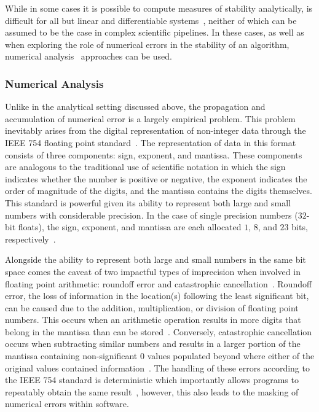 While in some cases it is possible to compute measures of stability analytically, is difficult for all but linear and
differentiable systems~\cite{kiusalaas2013numerical}, neither of which can be assumed to be the case in complex
scientific pipelines. In these cases, as well as when exploring the role of numerical errors in the stability of an
algorithm, numerical analysis~\cite{hildebrand1987introduction} approaches can be used.

\subsubsection{Numerical Analysis}
Unlike in the analytical setting discussed above, the propagation and accumulation of numerical error is a largely
empirical problem. This problem inevitably arises from the digital representation of non-integer data through the
IEEE 754 floating point standard~\cite{ieee754}. The representation of data in this format consists of three
components: sign, exponent, and mantissa. These components are analogous to the traditional use of scientific notation
in which the sign indicates whether the number is positive or negative, the exponent indicates the order of magnitude
of the digits, and the mantissa contains the digits themselves. This standard is powerful given its ability to
represent both large and small numbers with considerable precision. In the case of single precision numbers ($32$-bit
floats), the sign, exponent, and mantissa are each allocated $1$, $8$, and $23$ bits, respectively~\cite{ieee754}.

Alongside the ability to represent both large and small numbers in the same bit space comes the caveat of two impactful
types of imprecision when involved in floating point arithmetic: roundoff error and catastrophic
cancellation~\cite{muller2018handbook}. Roundoff error, the loss of information in the location(s) following the least
significant bit, can be caused due to the addition, multiplication, or division of floating point numbers. This occurs
when an arithmetic operation results in more digits that belong in the mantissa than can be
stored~\cite{muller2018handbook}. Conversely, catastrophic cancellation occurs when subtracting similar numbers and
results in a larger portion of the mantissa containing non-significant $0$ values populated beyond where either of the
original values contained information~\cite{muller2018handbook}. The handling of these errors according to the IEEE 754
standard is deterministic which importantly allows programs to repeatably obtain the same result~\cite{ieee754},
however, this also leads to the masking of numerical errors within software.

